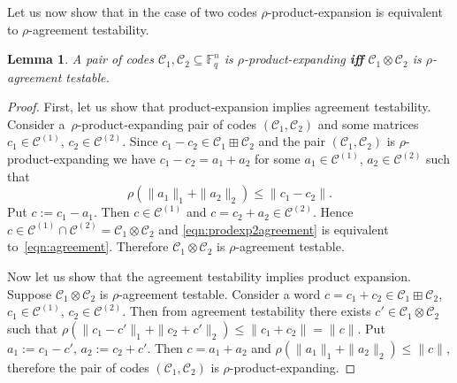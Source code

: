 \documentclass[11pt]{article}
\newcommand{\Iff}{\textbf{if\textcompwordmark f} }
\let\le\leqslant
\let\ge\geqslant
\theoremstyle{plain}
\newtheorem{lemma}{Lemma}
\theoremstyle{definition}
\theoremstyle{remark}
\newcommand{\cC}{\mathcal{C}}
\newcommand{\F}{\mathbb{F}}
\begin{document}

Let us now show that in the case of two codes $\rho$-product-expansion is equivalent to $\rho$-agreement testability.
\begin{lemma}\label{lemma:prodexp-vs-agreement}
    A pair of codes $\cC_1,\cC_2\subseteq \F_q^n$ is $\rho$-product-expanding \Iff $\cC_1\otimes \cC_2$ is $\rho$-agreement testable.
\end{lemma}
\begin{proof}
    First, let us show that product-expansion implies agreement testability. Consider a~$\rho$-product-expanding pair of codes $(\cC_1,\cC_2)$ and some matrices $c_1\in\cC^{(1)}$, $c_2\in\cC^{(2)}$. %
    Since $c_1-c_2\in \cC_1\boxplus \cC_2$ and the pair $(\cC_1,\cC_2)$ is $\rho$-product-expanding we have $c_1-c_2=a_1+a_2$ for some $a_1\in\cC^{(1)}$, $a_2\in\cC^{(2)}$ such that 
    \begin{equation}\label{eqn:prodexp2agreement}
        \rho(\|a_1\|_1+\|a_2\|_2)\le \|c_1-c_2\|.
    \end{equation}
    Put $c:=c_1-a_1$. Then $c\in \cC^{(1)}$ and $c=c_2+a_2\in \cC^{(2)}$. Hence $c\in \cC^{(1)}\cap\cC^{(2)} = \cC_1\otimes \cC_2$ and \eqref{eqn:prodexp2agreement} is equivalent to~\eqref{eqn:agreement}. Therefore $\cC_1\otimes \cC_2$ is $\rho$-agreement testable.
    
    Now let us show that the agreement testability implies product expansion. Suppose $\cC_1\otimes \cC_2$ is $\rho$-agreement testable. Consider a word $c=c_1+c_2\in \cC_1\boxplus \cC_2$, $c_1\in \cC^{(1)}$, $c_2\in\cC^{(2)}$. Then from agreement testability there exists $c'\in \cC_1\otimes\cC_2$ such that $\rho(\|c_1-c'\|_1+\|c_2+c'\|_2)\le \|c_1+c_2\|=\|c\|$. Put $a_1:=c_1-c'$, $a_2:=c_2+c'$. Then $c=a_1+a_2$ and $\rho(\|a_1\|_1+\|a_2\|_2)\le \|c\|$, therefore the pair of codes $(\cC_1,\cC_2)$ is $\rho$-product-expanding.
\end{proof}
\end{document}
